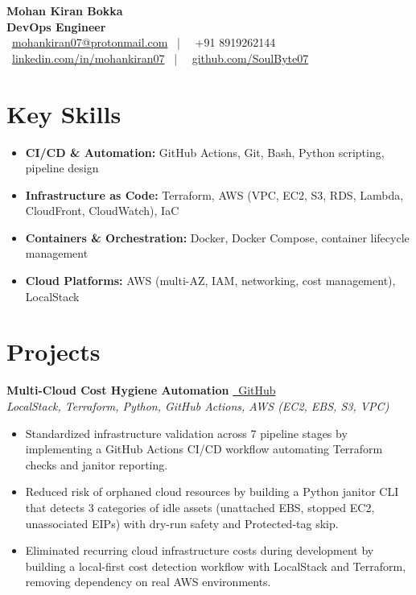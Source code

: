 \documentclass[10pt, letterpaper]{article}
\begin{document}
\pagestyle{empty}

\begin{center}
    {\LARGE \textbf{Mohan Kiran Bokka}} \\
    \vspace{2pt}
    {\large \textbf{DevOps Engineer}} \\
    \faEnvelope\ \href{mailto:mohankiran07@protonmail.com}{mohankiran07@protonmail.com} \ | \ \faPhone\ +91 8919262144 \\
    \faLinkedin\ \href{https://linkedin.com/in/mohankiran07}{linkedin.com/in/mohankiran07} \ | \ \faGithub\ \href{https://github.com/SoulByte07}{github.com/SoulByte07}
\end{center}

\section{Key Skills}
\begin{itemize}
    \item \textbf{CI/CD \& Automation:} GitHub Actions, Git, Bash, Python scripting, pipeline design
    \item \textbf{Infrastructure as Code:} Terraform, AWS (VPC, EC2, S3, RDS, Lambda, CloudFront, CloudWatch), IaC
    \item \textbf{Containers \& Orchestration:} Docker, Docker Compose, container lifecycle management
    \item \textbf{Cloud Platforms:} AWS (multi-AZ, IAM, networking, cost management), LocalStack
\end{itemize}

\section{Projects}

\noindent \textbf{Multi-Cloud Cost Hygiene Automation} \href{https://github.com/SoulByte07/Multi-Cloud-Cost-Hygiene-Automation}{\faGithub\ GitHub} \\
\textit{LocalStack, Terraform, Python, GitHub Actions, AWS (EC2, EBS, S3, VPC)}
\begin{itemize}
    \item Standardized infrastructure validation across 7 pipeline stages by implementing a GitHub Actions CI/CD workflow automating Terraform checks and janitor reporting.
    \item Reduced risk of orphaned cloud resources by building a Python janitor CLI that detects 3 categories of idle assets (unattached EBS, stopped EC2, unassociated EIPs) with dry-run safety and Protected-tag skip.
    \item Eliminated recurring cloud infrastructure costs during development by building a local-first cost detection workflow with LocalStack and Terraform, removing dependency on real AWS environments.
\end{itemize}
\end{document}
